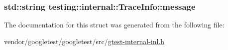 \subsubsection[{\texorpdfstring{message}{message}}]{\setlength{\rightskip}{0pt plus 5cm}std\+::string testing\+::internal\+::\+Trace\+Info\+::message}\hypertarget{structtesting_1_1internal_1_1TraceInfo_a39e74f39ce6d5fdbac799abdb1c27f90}{}\label{structtesting_1_1internal_1_1TraceInfo_a39e74f39ce6d5fdbac799abdb1c27f90}


The documentation for this struct was generated from the following file\+:\begin{DoxyCompactItemize}
\item 
vendor/googletest/googletest/src/\hyperlink{gtest-internal-inl_8h}{gtest-\/internal-\/inl.\+h}\end{DoxyCompactItemize}
